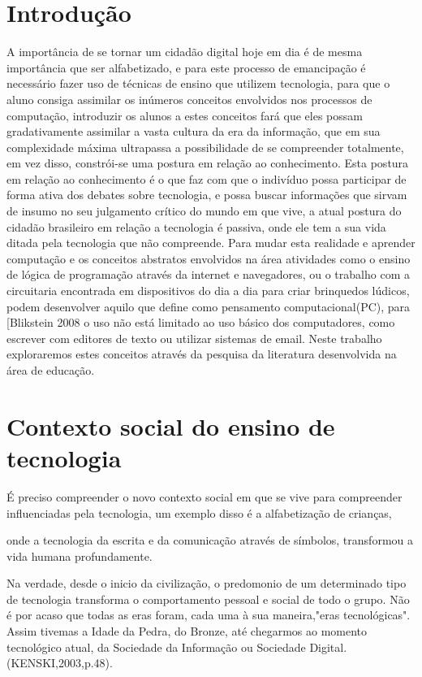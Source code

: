 \documentclass[article, 11pt, oneside, a4paper, english, brazil, sumario=tradicional]{abntex2}
\begin{document}
\section{Introdução}
    A importância de se tornar um cidadão digital hoje em dia é de mesma importância
que ser alfabetizado, e para este processo de emancipação é necessário fazer uso
de técnicas de ensino que utilizem tecnologia, para que o aluno consiga assimilar
os inúmeros conceitos envolvidos nos processos de computação, introduzir os
alunos a estes conceitos fará que eles possam gradativamente assimilar a vasta
cultura da era da informação,  que em sua complexidade máxima ultrapassa a
possibilidade de se compreender totalmente, em vez disso, constrói-se uma
postura em relação ao conhecimento. Esta postura em relação ao conhecimento é o
que faz com que o indivíduo possa participar de forma ativa dos debates sobre
tecnologia, e possa buscar informações que sirvam de insumo no seu julgamento
crítico do mundo em que vive, a atual postura do cidadão brasileiro em relação a
tecnologia é passiva, onde ele tem a sua vida ditada pela tecnologia que não
compreende.
    Para mudar esta realidade e aprender computação e os conceitos abstratos
envolvidos na área atividades como o ensino de lógica de programação através
da internet e navegadores, ou o trabalho com a circuitaria encontrada em
dispositivos do dia a dia para criar brinquedos lúdicos, podem desenvolver aquilo
que \cite{wing2006computational} define como pensamento computacional(PC), para [Blikstein 2008 o uso não
está limitado ao uso básico dos computadores, como escrever com editores de texto ou utilizar sistemas
de email.
    Neste trabalho exploraremos estes conceitos através da pesquisa da literatura
desenvolvida na área de educação.

\section{Contexto social do ensino de tecnologia}
    É preciso compreender o novo contexto social em que se vive para compreender
influenciadas pela tecnologia, um exemplo disso é a alfabetização de crianças,

onde a tecnologia da escrita e da comunicação através de símbolos, transformou a
vida humana profundamente.

\begin{citacao}
Na verdade, desde o inicio da civilização, o predomonio de um determinado tipo
de tecnologia transforma o comportamento pessoal e social de todo o grupo. Não é
por acaso que todas as eras foram, cada uma à sua maneira,"eras tecnológicas".
Assim tivemas a Idade da Pedra, do Bronze, até chegarmos ao momento tecnológico
atual, da Sociedade da Informação ou Sociedade Digital. (KENSKI,2003,p.48).
\end{citacao}
\end{document}
